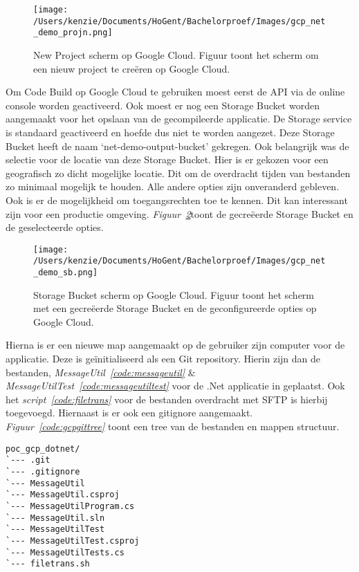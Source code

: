 \begin{figure}[!htbp]
    \centering
    \texttt{[image: /Users/kenzie/Documents/HoGent/Bachelorproef/Images/gcp\_net\_demo\_projn.png]}
    \caption{New Project scherm op Google Cloud. Figuur toont het scherm om een nieuw project te creëren op Google Cloud.}
    \label{fig:GCP_POC_projn}
\end{figure}

Om Code Build op Google Cloud te gebruiken moest eerst de API via de online console worden geactiveerd. Ook moest er nog een Storage Bucket worden aangemaakt voor het opslaan van de gecompileerde applicatie. De Storage service is standaard geactiveerd en hoefde dus niet te worden aangezet. Deze Storage Bucket heeft de naam ‘net-demo-output-bucket’ gekregen. Ook belangrijk was de selectie voor de locatie van deze Storage Bucket. Hier is er gekozen voor een geografisch zo dicht mogelijke locatie. Dit om de overdracht tijden van bestanden zo minimaal mogelijk te houden. Alle andere opties zijn onveranderd gebleven. Ook is er de mogelijkheid om toegangsrechten toe te kennen. Dit kan interessant zijn voor een productie omgeving. \emph{Figuur~\ref{fig:GCP_POC_sb}}toont de gecreëerde Storage Bucket en de geselecteerde opties.

\begin{figure}[!htbp]
    \centering
    \texttt{[image: /Users/kenzie/Documents/HoGent/Bachelorproef/Images/gcp\_net\_demo\_sb.png]}
    \caption{Storage Bucket scherm op Google Cloud. Figuur toont het scherm met een gecreëerde Storage Bucket en de geconfigureerde opties op Google Cloud.}
    \label{fig:GCP_POC_sb}
\end{figure}

Hierna is er een nieuwe map aangemaakt op de gebruiker zijn computer voor de applicatie. Deze is geïnitialiseerd als een Git repository. Hierin zijn dan de bestanden, \emph{MessageUtil~\ref{code:messageutil}} \& \emph{MessageUtilTest~\ref{code:messageutiltest}} voor de .Net applicatie in geplaatst. Ook het \emph{script~\ref{code:filetrans}} voor de bestanden overdracht met SFTP is hierbij toegevoegd. Hiernaast is er ook een gitignore aangemaakt. \emph{Figuur~\ref{code:gcpgittree}} toont een tree van de bestanden en mappen structuur.

\begin{lstlisting}
poc_gcp_dotnet/
`--- .git
`--- .gitignore
`--- MessageUtil
`--- MessageUtil.csproj
`--- MessageUtilProgram.cs
`--- MessageUtil.sln
`--- MessageUtilTest
`--- MessageUtilTest.csproj
`--- MessageUtilTests.cs
`--- filetrans.sh
\end{lstlisting}

